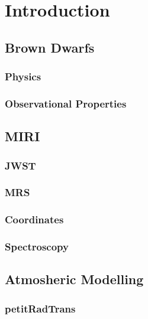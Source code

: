 
\chapter{Introduction}
\section{Brown Dwarfs}
\subsection{Physics}
\subsection{Observational Properties}
\section{MIRI}
\subsection{JWST}
\subsection{MRS}
\subsection{Coordinates}
\subsection{Spectroscopy}
\section{Atmosheric Modelling}
\subsection{petitRadTrans}